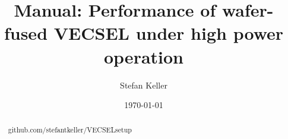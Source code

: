 \documentclass[11pt, a4paper, twoside]{article}
\title{Manual: Performance of wafer-fused VECSEL under high power operation}
\author{Stefan Keller}
\date{\today}
\numberwithin{equation}{section} %
\numberwithin{table}{section}
\numberwithin{figure}{section}
\begin{document}
\maketitle
{}
\fancyhead[LO]{\leftmark}

\begin{abstract}
github.com/stefantkeller/VECSELsetup
\end{abstract}

\tableofcontents\newpage





\newpage

\end{document}

